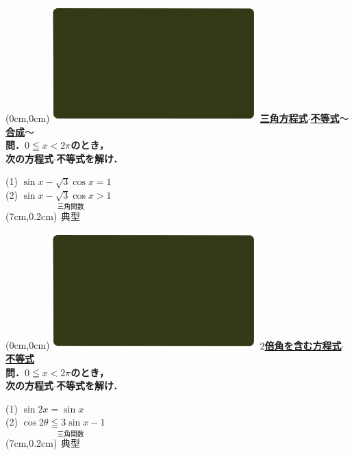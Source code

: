 \documentclass[10pt,
fleqn,
dvipdfmx,
uplatex
]{jsarticle}
\begin{document}
\at(0cm,0cm){\includegraphics[width=8cm,bb=0 0 1920 1080]{./youtube/thumbnails/templates/smart_background/三角関数.jpeg}}
{\color{orange}\bf\boldmath\Large\underline{三角方程式$\cdot$不等式$〜$合成$〜$}}\vspace{0.3zw}\\
\large
\bf\boldmath 問．$0\leqq x<2\pi$のとき，\\
\hfill 次の方程式$\cdot$不等式を解け．

\LARGE
(1)  $\sin x-\sqrt 3\cos x=1$\\
(2)  $\sin x-\sqrt 3\cos x>1$\\

\at(7cm,0.2cm){\small\color{bradorange}$\overset{\text{三角関数}}{\text{典型}}$}

\newpage

\at(0cm,0cm){\includegraphics[width=8cm,bb=0 0 1920 1080]{./youtube/thumbnails/templates/smart_background/三角関数.jpeg}}
{\color{orange}\bf\boldmath\Large\underline{$2$倍角を含む方程式$\cdot$不等式}}\vspace{0.3zw}\\
\large 
\bf\boldmath 問．$0\leqq x<2\pi$のとき，\\
\hfill 次の方程式$\cdot$不等式を解け．

\LARGE
(1)  $\sin 2x=\sin x$\\
(2)  $\cos 2\theta \leqq 3\sin x-1$\\

\at(7cm,0.2cm){\small\color{bradorange}$\overset{\text{三角関数}}{\text{典型}}$}

\newpage
\end{document}
